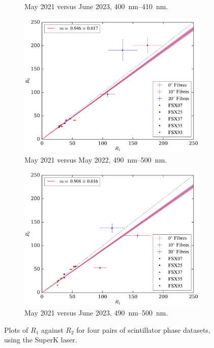 \begin{figure}[!th]
\begin{subfigure}{0.48\textwidth}
        \caption{May 2021 versus June 2023, \SIrange{400}{410}{\nm}.}
        \label{fig:smellie_scat_r1r2_sk405_jun23}
    \end{subfigure}
    \begin{subfigure}{0.48\textwidth}
        \centering
        \includegraphics[width=\textwidth]{5_SMELLIEAnalysis/images/R1_vs_R2_superK_490_500_May2022.pdf}
        \caption{May 2021 versus May 2022, \SIrange{490}{500}{\nm}.}
        \label{fig:smellie_scat_r1r2_sk495_may22}
    \end{subfigure}
    \begin{subfigure}{0.48\textwidth}
        \centering
        \includegraphics[width=\textwidth]{5_SMELLIEAnalysis/images/R1_vs_R2_superK_490_500_Jun2023.pdf}
        \caption{May 2021 versus June 2023, \SIrange{490}{500}{\nm}.}
        \label{fig:smellie_scat_r1r2_sk495_jun23}
    \end{subfigure}
    \caption[Plots of $R_{1}$ against $R_{2}$ for four pairs of scintillator phase datasets, using the SuperK laser]
    {Plots of $R_{1}$ against $R_{2}$ for four pairs of scintillator phase datasets, using the SuperK laser.}
    \label{fig:smellie_scat_r1r2_plots}
\end{figure}

